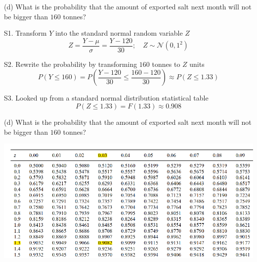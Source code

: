 \documentclass[
  11pt,
  ignorenonframetext,
]{beamer}
\begin{document}
\begin{frame}{(d) What is the probability that the amount of exported
salt next month will not be bigger than \(160\) tonnes?}
\protect\hypertarget{d-what-is-the-probability-that-the-amount-of-exported-salt-next-month-will-not-be-bigger-than-160-tonnes}{}
\normalsize

S1. Transform \(Y\) into the standard normal random variable \(Z\)
\small \[
Z = \frac{Y - \mu}{\sigma} = \frac{Y - 120}{30}; \quad Z \sim \mathcal{N}(0,1^2)
\]

\normalsize

S2. Rewrite the probability by transforming \(160\) tonnes to \(Z\)
units \small \[
P(Y \leq 160) = P\left(\frac{Y - 120}{30} \leq \frac{160 - 120}{30}\right) \approx P\left(Z \leq 1.33\right)
\]

\normalsize

S3. Looked up from a standard normal distribution statistical table
\small \[
P\left(Z \leq 1.33\right) = F(1.33) \approx 0.908
\]
\end{frame}

\begin{frame}{(d) What is the probability that the amount of exported
salt next month will not be bigger than \(160\) tonnes?}
\protect\hypertarget{d-what-is-the-probability-that-the-amount-of-exported-salt-next-month-will-not-be-bigger-than-160-tonnes-1}{}
\begin{center}\includegraphics[width=0.9\linewidth]{pictures/Zat1.33} \end{center}
\end{frame}
\end{document}
